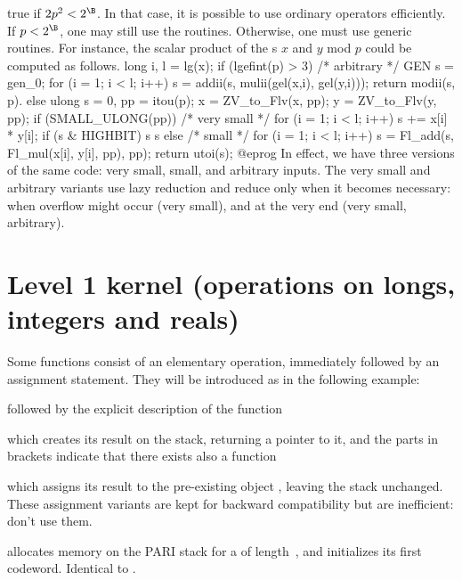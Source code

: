  true if $2p^2 <2^\B$. In that case, it is
possible to use ordinary operators efficiently. If $p < 2^\B$, one
may still use the  routines. Otherwise, one must use generic
routines. For instance, the scalar product of the s $x$ and $y$ mod
$p$ could be computed as follows.
\bprog
    long i, l = lg(x);
    if (lgefint(p) > 3)
    { /* arbitrary */
      GEN s = gen_0;
      for (i = 1; i < l; i++) s = addii(s, mulii(gel(x,i), gel(y,i)));
      return modii(s, p).
    }
    else
    {
      ulong s = 0, pp = itou(p);
      x = ZV_to_Flv(x, pp);
      y = ZV_to_Flv(y, pp);
      if (SMALL_ULONG(pp))
      { /* very small */
        for (i = 1; i < l; i++)
        {
          s += x[i] * y[i];
          if (s & HIGHBIT) s %
        }
        s %
      }
      else
      { /* small */
        for (i = 1; i < l; i++)
          s = Fl_add(s, Fl_mul(x[i], y[i], pp), pp);
      }
      return utoi(s);
    }
@eprog\noindent
In effect, we have three versions of the same code: very small, small, and
arbitrary inputs. The very small and arbitrary variants use lazy reduction
and reduce only when it becomes necessary: when overflow might occur (very
small), and at the very end (very small, arbitrary).

\section{Level 1 kernel (operations on longs, integers and reals)}

 Some functions consist of an elementary operation,
immediately followed by an assignment statement. They will be introduced as
in the following example:

 followed by the explicit
description of the function


\noindent which creates its result on the stack, returning a  pointer
to it, and the parts in brackets indicate that there exists also a function


\noindent which assigns its result to the pre-existing object
, leaving the stack unchanged. These assignment variants are kept for
backward compatibility but are inefficient: don't use them.


 allocates memory on the PARI stack for a 
of length~, and initializes its first codeword. Identical to
.

